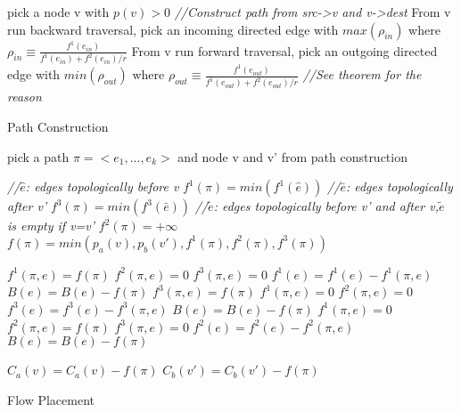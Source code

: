 \documentclass{sig-alternate}
\begin{document}
\begin{algorithm}\label {Path Construction}
\SetAlgoLined
\BlankLine
pick a node v with $p(v)>0$\;
\emph{//Construct path from src->v and v->dest}\;
From v run backward traversal, pick an incoming directed edge with $ max( \rho_{in} )  $ where $\rho_{in} \equiv \frac{ f^1(e_{in})}{f^1(e_{in})+ f^2(e_{in})/r}$\;
From v run forward traversal, pick an outgoing directed edge with $ min(\rho_{out} ) $ where $\rho_{out} \equiv \frac{  f^1(e_{out})}{f^1(e_{out})+ f^2(e_{out})/r } $\;
\emph{//See theorem for the reason}\;
\caption{ Path Construction}
\end{algorithm}






\begin{algorithm}\label {Flow Placement}
\SetAlgoLined
\BlankLine
{}
{

pick a path $\pi = <e_1, \dots, e_k> $ and node v and v' from path construction\;

	\emph{//$\hat{e}$: edges topologically before v }\;
	$f^1 (\pi)= min(f^1(\hat{e}))$\;
	\emph{//$\bar{e}$: edges topologically after v'  }\;
	$f^3 (\pi)= min(f^3(\bar{e}))$\;
	\emph{//$\tilde{e}$: edges topologically before v' and after v,$\tilde{e}$ is empty if v=v'}\;
	{
	$f^2 (\pi)=+ \infty$\;
	}
	$f(\pi) = min( p_a(v), p_b(v'), f^1(\pi) ,  f^2(\pi), f^3(\pi) ) $\;
	
	{
	$f^1(\pi, e) = f(\pi)$\;
	$f^2(\pi, e) = 0$\;
	$f^3(\pi, e) = 0$\;
	$f^1(e) = f^1(e) - f^1(\pi, e)$\;
	$B(e)=B(e)-f(\pi)$
	}
	{
	$f^3(\pi, e) = f(\pi)$\;
	$f^1(\pi, e) = 0$\;
	$f^2(\pi, e) = 0$\;
	$f^3(e) = f^3(e) - f^3(\pi, e)$\;
	$B(e)=B(e)-f(\pi)$
	}
	{
	$f^1(\pi, e) = 0$\;
	$f^2(\pi, e) = f(\pi)$\;
	$f^3(\pi, e) = 0$\;
	$f^2(e) = f^2(e) - f^2(\pi, e)$\;
	$B(e)=B(e)-f(\pi)$
	}
	
	$C_a(v) = C_a(v) - f(\pi)$\;
	$C_b(v') = C_b(v') - f(\pi)$\;
}
\caption{Flow Placement}
\end{algorithm}
\end{document}

